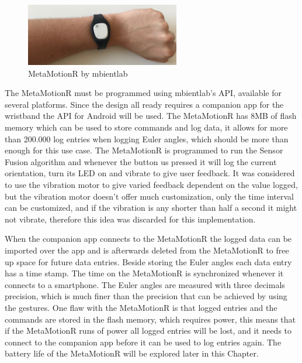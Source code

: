 \begin{figure}[h!]
    \centering
    \includegraphics[width=0.6\textwidth]{figures/mbient.jpg}
    \caption{MetaMotionR by mbientlab\cite{mbient}}
    \label{mbient}
\end{figure}

The MetaMotionR must be programmed using mbientlab's API, available for several platforms\cite{api_mbient}. Since the design all ready requires a companion app for the wristband the API for Android will be used. The MetaMotionR has 8MB of flash memory which can be used to store commands and log data, it allows for more than 200.000 log entries when logging Euler angles, which should be more than enough for this use case. The MetaMotionR is programmed to run the Sensor Fusion algorithm and whenever the button us pressed it will log the current orientation, turn its LED on and vibrate to give user feedback. It was considered to use the vibration motor to give varied feedback dependent on the value logged, but the vibration motor doesn't offer much customization, only the time interval can be customized, and if the vibration is any shorter than half a second it might not vibrate, therefore this idea was discarded for this implementation.

When the companion app connects to the MetaMotionR the logged data can be imported over the app and is afterwards deleted from the MetaMotionR to free up space for future data entries. Beside storing the Euler angles each data entry has a time stamp. The time on the MetaMotionR is synchronized whenever it connects to a smartphone. The Euler angles are measured with three decimals precision, which is much finer than the precision that can be achieved by using the gestures. One flaw with the MetaMotionR is that logged entries and the commands are stored in the flash memory, which requires power, this means that if the MetaMotionR runs of power all logged entries will be lost, and it needs to connect to the companion app before it can be used to log entries again. The battery life of the MetaMotionR will be explored later in this Chapter. 

